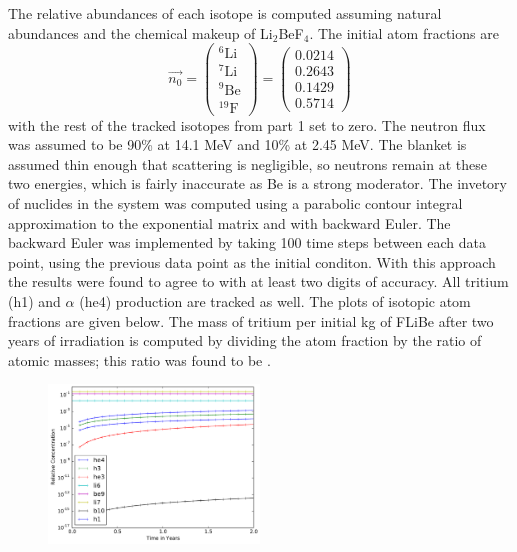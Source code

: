 \documentclass[12pt]{article}
\newenvironment{solnum}[2][Solution]{\begin{trivlist}
\item[\hskip \labelsep {\bfseries #1}\hskip \labelsep {\bfseries #2:}]\hspace{0.3in}\newline\newline}{\end{trivlist}}
\begin{document}
\begin{solnum}{1-2}

    The relative abundances of each isotope is computed assuming natural abundances and the
    chemical makeup of Li$_2$BeF$_4$.  The initial atom fractions are
    \begin{equation}
        \vec{n_0} =  \begin{pmatrix}
            ^{6}\text{Li} \\
            ^{7}\text{Li}\\ 
            ^{9} \text{Be}\\ 
            ^{19}\text{F}
        \end{pmatrix} = 
     \begin{pmatrix}
            0.0214   \\
            0.2643   \\ 
            0.1429    \\ 
            0.5714 
        \end{pmatrix} 
    \end{equation} 
    with the rest of the tracked isotopes from part 1 set to zero. 
    The neutron flux was assumed to be 90\% at 14.1 MeV and 10\% at 2.45 MeV.
    The blanket is assumed thin enough that scattering is negligible, so neutrons
    remain at these two energies, which is fairly inaccurate as Be is a strong
    moderator.
    The invetory of nuclides in the system was computed using a parabolic contour integral
    approximation to the exponential matrix and with backward Euler.  The backward Euler was implemented by taking 100 time steps
    between each data point, using the previous data point as the initial conditon.  With this approach the results were found to agree to
    with at least two digits of accuracy.  All tritium (h1) and $\alpha$ (he4)
    production are tracked as well. The plots of isotopic atom fractions are given
    below.  The mass of tritium per initial kg of FLiBe after two years of
    irradiation is computed by dividing the atom fraction by the ratio of atomic
    masses; this ratio was found to be .
    \begin{figure}
        \centering
        \includegraphics[width=0.5\textwidth]{p1.pdf}

\end{figure}
\end{solnum}
\end{document}
